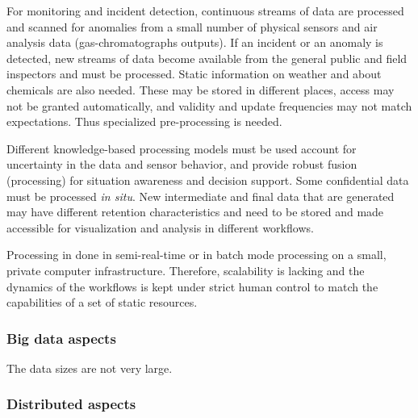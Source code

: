 For monitoring and incident detection, continuous streams of data are processed and scanned for
anomalies from a small number of physical sensors and air analysis data (gas-chromatographs
outputs).  If an incident or an anomaly is detected, new streams of data become available from the general public and field inspectors and must be processed. Static information on weather
and about chemicals are also needed.  These may be stored in
different places, access may not be granted automatically, and validity and update frequencies may not
match expectations. Thus specialized pre-processing is needed.

Different knowledge-based processing models must be used account for uncertainty in
the data and sensor behavior, and provide robust fusion (processing) for situation awareness and
decision support. Some confidential data must be processed \emph{in situ}. New
intermediate and final data that are generated may have different retention characteristics and
need to be stored and made accessible for visualization and analysis in different workflows.

Processing in done in semi-real-time or in batch mode processing on a
small, private computer infrastructure. Therefore, scalability is
lacking and the dynamics of the workflows is kept under strict human
control to match the capabilities of a set of static resources.

 \subsubsection*{Big data aspects}



The data sizes are not very large.

 \subsubsection*{Distributed aspects}



